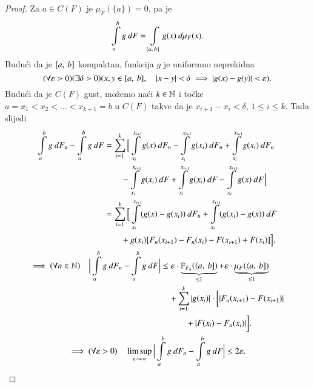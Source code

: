 \begin{proof}
    Za $a \in C(F)$ je $\mu_F (\{ a \}) = 0$, pa je
    \begin{equation*}
        \int\limits_a^b g \: dF = \int\limits_{\langle {a}, \: {b}]} g(x) \: d \mu_F (x).
    \end{equation*}
    Budu\' ci da je $[{a}, \:{b}]$ kompaktan, funkcija $g$ je uniformno neprekidna
    \begin{equation*}
        (\forall \varepsilon > 0) (\exists \delta > 0) (x, y \in [{a}, \:{b}], \quad |x - y| < \delta \implies |g(x) - g(y)| < \varepsilon).
    \end{equation*}
    Budu\' ci da je $C(F)$ gust, mo\v zemo na\' ci $k \in \mathbb{N}$ i to\v cke $a = x_1 < x_2 < \ldots < x_{k + 1} = b$ u $C(F)$ takve da je $x_{i + 1} - x_i < \delta$, $1 \leq i \leq k$.
    Tada slijedi
    \begin{equation*}
        \begin{gathered}
            \begin{aligned}
                \int\limits_a^b g \: d F_n - \int\limits_a^b g \: d F &= \sum\limits_{i = 1}^{k} \Big[ \int\limits_{x_i}^{x_{i+1}} g(x) \: d F_n - \int\limits_{x_i}^{x_{i + 1}} g(x_i) \: d F_n + \int\limits_{x_i}^{x_{i+1}} g(x_i) \: d F_n\\
                &\quad \quad- \int\limits_{x_i}^{x_{i + 1}} g(x_i) \: d F + \int\limits_{x_i}^{x_{i + 1}} g(x_i) \: d F - \int\limits_{x_i}^{x_{i + 1}} g(x) \: d F \Big]\\
                &= \sum\limits_{i = 1}^{k} \Big[ \int\limits_{x_i}^{x_{i + 1}} (g (x) - g(x_i)) \: d F_n + \int\limits_{x_i}^{x_{i + 1}} (g(x_i) - g(x)) \: d F\\
                &\quad \quad+ g(x_i) [ F_n (x_{i + 1}) - F_n (x_i) - F (x_{i + 1}) + F(x_i) ] \Big].
            \end{aligned}\\
            \begin{aligned}
                \implies (\forall n \in \mathbb{N}) \quad \Big| \int\limits_a^b g \: d F_n - \int\limits_a^b g \: d F \Big| &\leq \varepsilon \cdot \underbrace{\mathbb{P}_{F_n} (\langle {a}, \: {b}])}_{\leq 1} + \varepsilon \cdot \underbrace{\mu_{F} (\langle {a}, \: {b}])}_{\leq 1}\\
                &\quad + \sum\limits_{i = 1}^{k} | g(x_i) | \cdot \bigg[| F_n (x_{i + 1}) - F (x_{i + 1}) |\\
                &\quad \quad \quad+ | F(x_i) - F_n (x_i) | \bigg].
            \end{aligned}\\
            \implies (\forall \varepsilon > 0) \quad \limsup\limits_{n \to \infty} \Big| \int\limits_a^b g \: d F_n - \int\limits_a^b g \: d F \Big| \leq 2 \varepsilon.
        \end{gathered}
    \end{equation*}
\end{proof}

